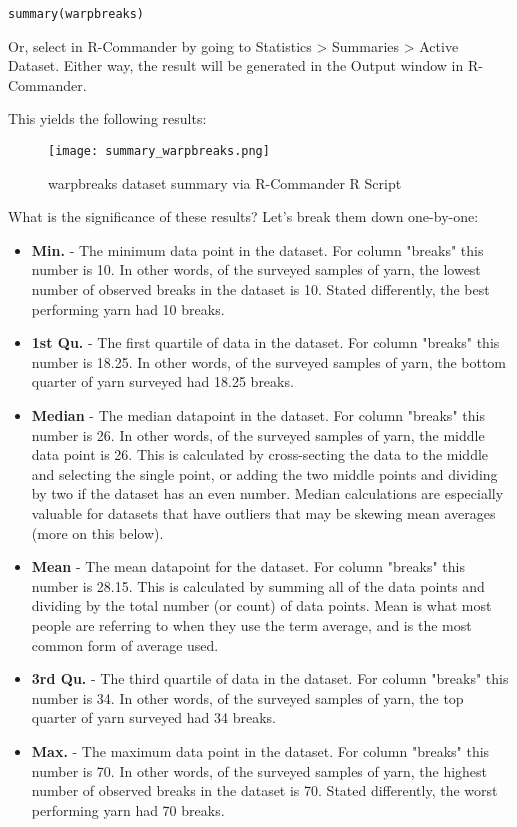 \texttt{summary(warpbreaks)}

Or, select in R-Commander by going to Statistics > Summaries > Active Dataset. 
Either way, the result will be generated in the Output window in R-Commander.

This yields the following results:

\begin{figure}[h!]
\texttt{[image: summary\_warpbreaks.png]}
 \caption{warpbreaks dataset summary via R-Commander R Script}
 \label{fig:summary_warpbreaks}
\end{figure}

What is the significance of these results? Let's break them down one-by-one:

\begin{itemize}
 \item \textbf{Min.} - The minimum data point in the dataset. For column 
 "breaks" this number is 10. In other words, of the surveyed samples of yarn, 
 the lowest number of observed breaks in the dataset is 10. Stated differently,
  the best performing yarn had 10 breaks.
 \item \textbf{1st Qu.} - The first quartile of data in the dataset. For column
  "breaks" this number is 18.25. In other words, of the surveyed samples of 
  yarn, the bottom quarter of yarn surveyed had 18.25 breaks.
 \item \textbf{Median} - The median datapoint in the dataset. For column 
 "breaks" this number is 26. In other words, of the surveyed samples of yarn, 
 the middle data point is 26. This is calculated by cross-secting the data to 
 the middle and selecting the single point, or adding the two middle points and
  dividing by two if the dataset has an even number. Median calculations are 
  especially valuable for datasets that have outliers that may be skewing mean 
  averages (more on this below).
 \item \textbf{Mean} - The mean datapoint for the dataset. For column "breaks" 
 this number is 28.15. This is calculated by summing all of the data points and
  dividing by the total number (or count) of data points. Mean is what most 
  people are referring to when they use the term average, and is the most 
  common form of average used.
 \item \textbf{3rd Qu.} - The third quartile of data in the dataset. For column
  "breaks" this number is 34. In other words, of the surveyed samples of yarn, 
  the top quarter of yarn surveyed had 34 breaks.
 \item \textbf{Max.} - The maximum data point in the dataset. For column 
 "breaks" this number is 70. In other words, of the surveyed samples of yarn, 
 the highest number of observed breaks in the dataset is 70. Stated 
 differently, the worst performing yarn had 70 breaks.
\end{itemize}

